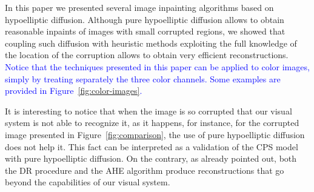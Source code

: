 \documentclass[proc]{edpsmath}
\begin{document}
In this paper we presented several image inpainting algorithms based on hypoelliptic diffusion. Although pure hypoelliptic diffusion allows to obtain reasonable inpaints of images with small corrupted regions, we showed that coupling such diffusion with heuristic methods exploiting the full knowledge of the location of the corruption allows to obtain very efficient reconstructions. 
\textcolor{blue}{
Notice that the techniques presented in this paper can be applied to color images, simply by treating separately the three color channels. Some examples are provided in Figure~\ref{fig:color-images}.}

It is interesting to notice that when the image is so corrupted that our visual system is not able to recognize it, as it happens, for instance, for the corrupted image presented in Figure~\ref{fig:comparison}, the use of pure hypoelliptic diffusion does not help it.
This fact can be interpreted as a validation of the CPS model with pure hypoelliptic diffusion. On the contrary, as already pointed out, both the DR procedure and the AHE algorithm produce reconstructions that go beyond the capabilities of our visual system.



\end{document}
